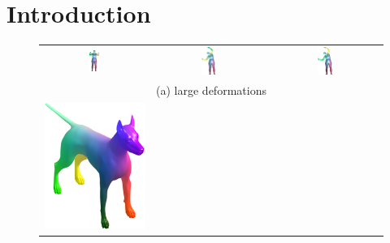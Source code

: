 \chapter{Introduction}\label{chap:intro}
\begin{figure}[b!]
	\centering
	\setlength\tabcolsep{3pt}
	\begin{tabular}{ccc}
		\includegraphics[width=0.1\textwidth]{figures/test_scan_031_test_scan_034_PFM.png}  &
		\includegraphics[width=0.1333\textwidth]{figures/test_scan_034.png} &
		\includegraphics[width=0.1333\textwidth]{figures/test_scan_031_test_scan_034.png}\\
		\multicolumn{3}{c}{(a) large deformations}\\
		\includegraphics[scale=0.5]{figures/dog_base.png}&

\end{tabular}
\end{figure}

